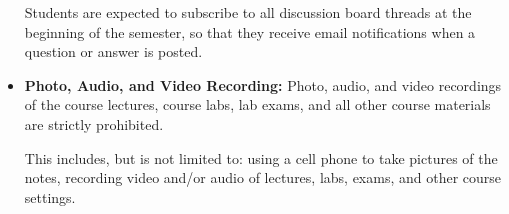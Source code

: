 \documentclass[11pt]{article}
\begin{document}
\begin{itemize}
Students are expected to subscribe to all discussion board threads at the beginning of the semester, so that they receive email notifications when a question or answer is posted.


\item {\bf Photo, Audio, and Video Recording:}  Photo, audio, and video recordings of the course lectures, course labs, lab exams, and all other course materials are strictly prohibited.

This includes, but is not limited to:  using a cell phone to take pictures of the notes, recording video and/or audio of lectures, labs, exams, and other course settings.  


\end{itemize}
\end{document}
